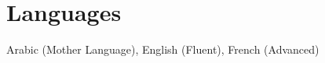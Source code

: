 \documentclass[A4,11pt]{article}
\makeatletter
\newcommand{\CVSubheading}[4]{
  \vspace{-2pt}\item
    \begin{tabular*}{0.97\textwidth}[t]{l@{\extracolsep{\fill}}r}
      \textbf{#1} & #2 \\
      \small#3 & \small #4 \\
    \end{tabular*}\vspace{-7pt}
}
\newcommand{\CVSubheadingshort}[2]{
  \vspace{-2pt}\item
    \begin{tabular*}{0.97\textwidth}[t]{l@{\extracolsep{\fill}}r}
      \textbf{#1} & #2 \\
    \end{tabular*}\vspace{-7pt}
}
\newcommand{\CVSubHeadingListStart}{\begin{itemize}[leftmargin=0.5cm, label={}]}
\newcommand{\CVSubHeadingListEnd}{\end{itemize}}
\makeatother
\begin{document}

\section{Languages}
 \begin{itemize}[leftmargin=0.5cm, label={}]
    \small{\item{
     Arabic (Mother Language), English (Fluent), French (Advanced) \\
    }}
 \end{itemize}
    
\end{document}

